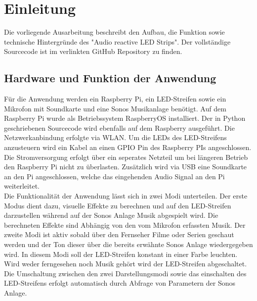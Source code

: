 \chapter{Einleitung}

Die vorliegende Ausarbeitung beschreibt den Aufbau, die Funktion sowie technische Hintergründe des "Audio reactive LED Strips".
Der vollständige Sourcecode ist im verlinkten GitHub Repository zu finden.

\section{Hardware und Funktion der Anwendung}
Für die Anwendung werden ein Raspberry Pi, ein LED-Streifen sowie ein Mikrofon mit Soundkarte und eine Sonos Musikanlage benötigt.
Auf dem Raspberry Pi wurde als Betriebssystem RaspberryOS installiert. Der in Python geschriebenen Sourcecode wird ebenfalls auf dem 
Raspberry ausgeführt. Die Netzwerkanbindung erfolgte via WLAN.
Um die LEDs des LED-Streifens anzusteuern wird ein Kabel an einen GPIO Pin des Raspberry PIs angeschlossen. Die Stromversorgung erfolgt über ein seperates Netzteil um
bei längeren Betrieb den Raspberry Pi nicht zu überlasten. Zusätzlich wird via USB eine Soundkarte an den Pi angeschlossen, welche das eingehenden Audio Signal an den Pi weiterleitet.
\\
Die Funktionalität der Anwendung lässt sich in zwei Modi unterteilen. Der erste Modus dient dazu, visuelle Effekte zu berechnen und auf den
LED-Streifen darzustellen während auf der Sonos Anlage Musik abgespielt wird. Die berechneten Effekte sind Abhängig von den vom Mikrofon 
erfassten Musik. Der zweite Modi ist aktiv sobald über den Fernseher Filme oder Serien geschaut werden und der Ton dieser über die bereits
erwähnte Sonos Anlage wiedergegeben wird. In diesem Modi soll der LED-Streifen konstant in einer Farbe leuchten. 
Wird weder ferngesehen noch Musik gehört wird der LED-Streifen abgeschaltet. Die Umschaltung zwischen den zwei Darstellungsmodi sowie das einschalten des LED-Streifens
erfolgt automatisch durch Abfrage von Parametern der Sonos Anlage.  

